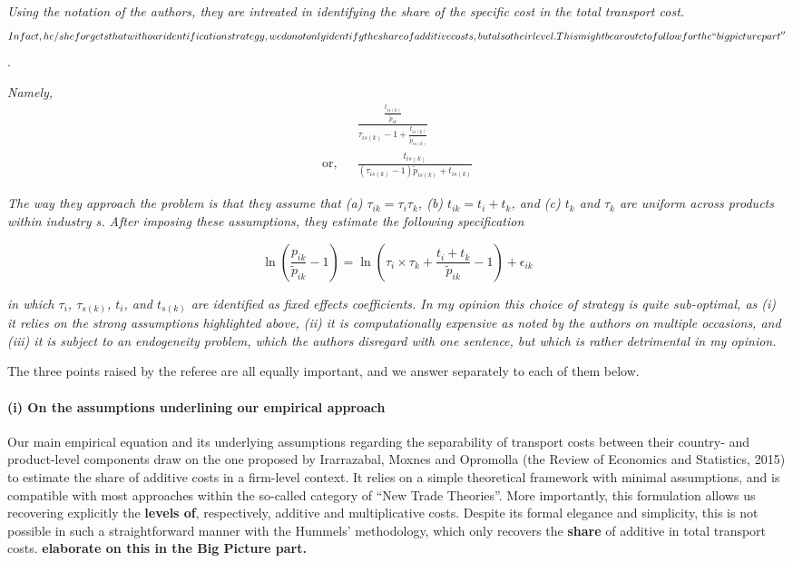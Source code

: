\documentclass[a4paper,12pt]{article}
\begin{document}
\textit{Using the notation of the authors, they are intreated
in identifying the share of the specific cost in the total transport cost.} \textbf{\[In fact, he/she forgets that with our identification strategy, we do not only identify the share of additive costs, but also their level. This might be a route to follow for the ``big picture part''\]}.


\textit{ Namely,}
\begin{eqnarray*}
&& \frac{\frac{t_{is(k)}}{\tilde{p}_{ik}}}{\tau_{is(k)}-1 + \frac{t_{is(k)}}{\tilde{p}_{is(k)}}} \\
\text{or,} &&\frac{t_{is(k)}}{(\tau_{is(k)}-1)\tilde{p}_{is(k)} + t_{is(k)}}
\end{eqnarray*}

\textit{The way they approach the problem is that they assume that (a) $\tau_{ik} = \tau_i\tau_{k}$,
(b) $t_{ik} = t_i +t_k$, and (c) $t_k$ and $\tau_k$ are uniform across products within industry
s. After imposing these assumptions, they estimate the following specification}

\begin{equation}
\ln\left(\frac{p_{ik}}{\widetilde{p}_{ik}}-1 \right)= \ln \left(\tau_{i} \times \tau_{k}+\frac{t_{i} + t_{k}}{\widetilde{p}_{ik}}-1 \right) + \epsilon_{ik} \label{eq:equation0}
\end{equation}

\textit{in which $\tau_i$, $\tau_{s(k)}$, $t_i$, and $t_{s(k)}$ are identified as fixed effects coefficients.
In my opinion this choice of strategy is quite sub-optimal, as (i) it relies on
the strong assumptions highlighted above, (ii) it is computationally expensive
as noted by the authors on multiple occasions, and (iii) it is subject to an
endogeneity problem, which the authors disregard with one sentence, but which
is rather detrimental in my opinion.}

The three points raised by the referee are all equally important, and we answer separately to each of them below.



\paragraph{(i) On the assumptions underlining our empirical approach}
Our main empirical equation and its underlying assumptions regarding the separability of transport costs between their country- and product-level components draw on the one proposed by Irarrazabal, Moxnes and Opromolla (the Review of Economics and Statistics, 2015) to estimate the share of additive costs in a firm-level context. It relies on a simple theoretical framework with minimal assumptions, and is compatible with most approaches within the so-called category of ``New Trade Theories''. More importantly, this formulation allows us recovering explicitly the \textbf{levels of}, respectively, additive and multiplicative costs. Despite its formal elegance and simplicity, this is not possible in such a straightforward manner with the Hummels' methodology, which only recovers the \textbf{share} of additive in total transport costs. \textbf{elaborate on this in the Big Picture part.}
\end{document}
